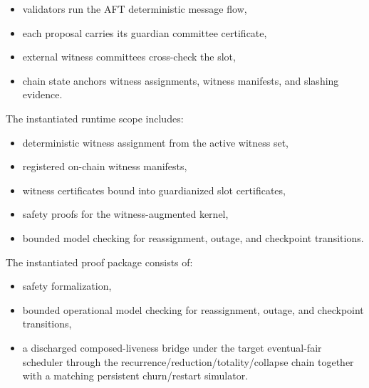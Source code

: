 \documentclass[11pt]{article}
\newcommand{\AFT}{\textsc{AFT}}
\begin{document}
\begin{itemize}[leftmargin=1.5em]
\item validators run the \AFT{} deterministic message flow,
\item each proposal carries its guardian committee certificate,
\item external witness committees cross-check the slot,
\item chain state anchors witness assignments, witness manifests, and slashing
evidence.
\end{itemize}

The instantiated runtime scope includes:

\begin{itemize}[leftmargin=1.5em]
\item deterministic witness assignment from the active witness set,
\item registered on-chain witness manifests,
\item witness certificates bound into guardianized slot certificates,
\item safety proofs for the witness-augmented kernel,
\item bounded model checking for reassignment, outage, and checkpoint
transitions.
\end{itemize}

The instantiated proof package consists of:

\begin{itemize}[leftmargin=1.5em]
\item safety formalization,
\item bounded operational model checking for reassignment, outage, and
checkpoint transitions,
\item a discharged composed-liveness bridge under the target eventual-fair
scheduler through the recurrence/reduction/totality/collapse chain together
with a matching persistent churn/restart simulator.
\end{itemize}
\end{document}
